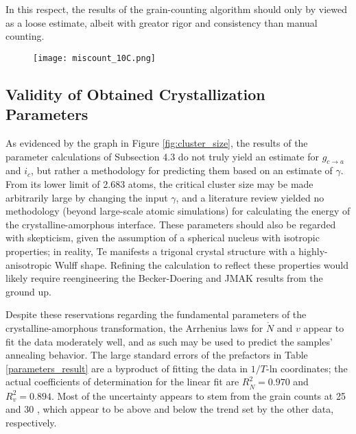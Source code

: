 In this respect, the results of the grain-counting algorithm should only by viewed as a loose estimate, albeit with greator rigor and consistency than manual counting.

	\begin{figure}[h]
		\centering
		\texttt{[image: miscount\_10C.png]}
		\caption{}
		\label{fig:miscount}
	\end{figure}

\subsection{Validity of Obtained Crystallization Parameters}

As evidenced by the graph in Figure \ref{fig:cluster_size}, the results of the parameter calculations of Subsection 4.3 do not truly yield an estimate for $g_{c \rightarrow a}$ and $i_c$, but rather a methodology for predicting them based on an estimate of $\gamma$.  From its lower limit of 2.683 atoms, the critical cluster size may be made arbitrarily large by changing the input $\gamma$, and a literature review yielded no methodology (beyond large-scale atomic simulations) for calculating the energy of the crystalline-amorphous interface.  These parameters should also be regarded with skepticism, given the assumption of a spherical nucleus with isotropic properties; in reality, Te manifests a trigonal crystal structure with a highly-anisotropic Wulff shape.  Refining the calculation to reflect these properties would likely require reengineering the Becker-Doering and JMAK results from the ground up.

Despite these reservations regarding the fundamental parameters of the crystalline-amorphous transformation, the Arrhenius laws for $\dot{N}$ and $v$ appear to fit the data moderately well, and as such may be used to predict the samples' annealing behavior.  The large standard errors of the prefactors in Table \ref{parameters_result} are a byproduct of fitting the data in $1/T$-ln coordinates; the actual coefficients of determination for the linear fit are $R^2_{\dot{N}} = 0.970$ and $R^2_v = 0.894$.  Most of the uncertainty appears to stem from the grain counts at 25  and 30 , which appear to be above and below the trend set by the other data, respectively.

